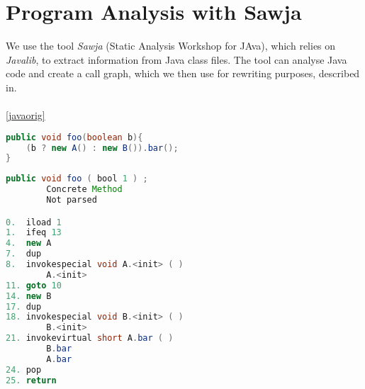 \section{Program Analysis with Sawja}
We use the tool \textit{Sawja} (Static Analysis Workshop for JAva)\cite{sawja}, which relies on \textit{Javalib}, to extract information from Java class files. The tool can analyse Java code and create a call graph, which we then use for rewriting purposes, described in.\\\\

\cref{javaorig}





\begin{lstlisting}[caption=Java sample.,language=Java,label=lst:javaorig]
public void foo(boolean b){
    (b ? new A() : new B()).bar();
}
\end{lstlisting}

\begin{lstlisting}[caption=Sawja sample.,language=Java,label=lst:javasawja]
public void foo ( bool 1 ) ;
		Concrete Method
    	Not parsed

0.  iload 1
1.  ifeq 13
4.  new A
7.  dup
8.  invokespecial void A.<init> ( )
        A.<init>
11. goto 10
14. new B
17. dup
18. invokespecial void B.<init> ( )
        B.<init>
21. invokevirtual short A.bar ( )
        B.bar
        A.bar
24. pop
25. return

\end{lstlisting}